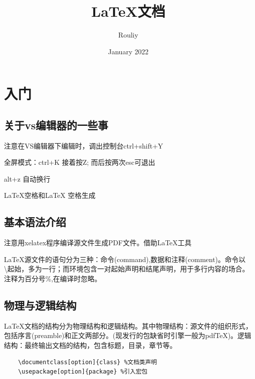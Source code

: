 \documentclass[16pt]{article}
\title{LaTeX文档}
\author{Rouliy }
\date{January 2022}
\begin{document}
\maketitle

\tableofcontents

\section{入门}
\subsection{关于vs编辑器的一些事}
注意在VS编辑器下编辑时，调出控制台ctrl+shift+Y
\par
全屏模式：ctrl+K 接着按Z; 而后按两次esc可退出
\par
alt+z 自动换行

\LaTeX 空格和\LaTeX{} 空格生成
\subsection{基本语法介绍}
注意用xelatex程序编译源文件生成PDF文件。借助LaTeX工具
\par
\LaTeX{}源文件的语句分为三种：命令(command),数据和注释(comment)。命令以\textbackslash 起始，多为一行；而环境包含一对起始声明和结尾声明，用于多行内容的场合。注释为百分号\%,在编译时忽略。

\subsection{物理与逻辑结构}
\LaTeX{}文档的结构分为物理结构和逻辑结构。其中物理结构：源文件的组织形式，包括序言(preamble)和正文两部分。(现发行的包缺省时引擎一般为pdfTeX)。逻辑结构：最终输出文档的结构，包含标题，目录，章节等。
\par
\begin{lstlisting}
    \documentclass[option]{class} %文档类声明
    \usepackage[option]{package} %引入宏包
\end{lstlisting}
\end{document}
